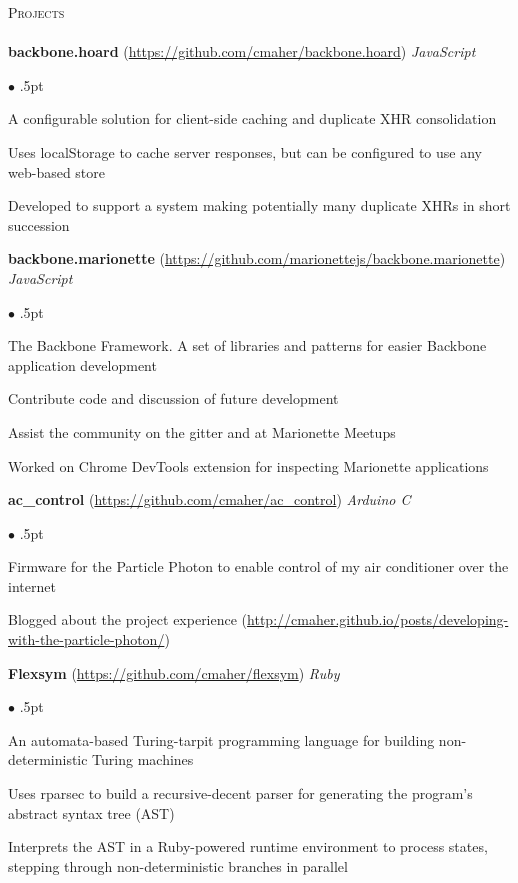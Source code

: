 \documentclass{article}
\newcommand{\lineunder}{\vspace*{-8pt} \\ \hspace*{-18pt} \hrulefill \\}
\newcommand{\header}[1]{{\hspace*{-15pt}\vspace*{8pt} \textsc{#1}} \vspace*{-4pt} \lineunder}
\newcommand{\project}[3]{{ \textbf{#1} (\url{#2}) \hfill \textit{#3} \\ }}
\newenvironment{achievements}{\begin{list}{$\bullet$}{\topsep 0pt \itemsep .5pt}}{\vspace*{4pt}\end{list}}
\begin{document}
\header{Projects}

\project{backbone.hoard}{https://github.com/cmaher/backbone.hoard}{JavaScript}
    \begin{achievements}
    \item A configurable solution for client-side caching and duplicate XHR consolidation
    \item Uses localStorage to cache server responses, but can be configured to use any web-based store
    \item Developed to support a system making potentially many duplicate XHRs in short succession
    \end{achievements}


\project{backbone.marionette}{https://github.com/marionettejs/backbone.marionette}{JavaScript}
    \begin{achievements}
    \item The Backbone Framework. A set of libraries and patterns for easier Backbone application development
    \item Contribute code and discussion of future development
    \item Assist the community on the gitter and at Marionette Meetups
    \item Worked on Chrome DevTools extension for inspecting Marionette applications
    \end{achievements}


\project{ac\_control}{https://github.com/cmaher/ac\_control}{Arduino C}
    \begin{achievements}
    \item Firmware for the Particle Photon to enable control of my air conditioner over the internet
    \item Blogged about the project experience (\url{http://cmaher.github.io/posts/developing-with-the-particle-photon/})
    \end{achievements}

\project{Flexsym}{https://github.com/cmaher/flexsym}{Ruby}
    \begin{achievements}
    \item An automata-based Turing-tarpit programming language for building non-deterministic Turing machines
    \item Uses rparsec to build a recursive-decent parser for generating the program's abstract syntax tree (AST)
    \item Interprets the AST in a Ruby-powered runtime environment to process states, stepping through non-deterministic branches in parallel
    \end{achievements}
\end{document}
